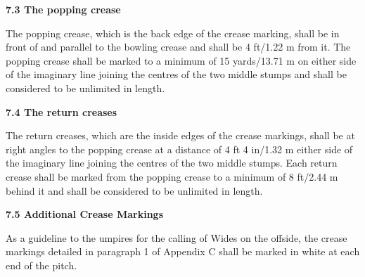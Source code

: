 \documentclass[12pt]{article}
\begin{document}
\vspace{\baselineskip}
{\fontsize{11pt}{13.2pt}\selectfont \textbf{7.3 \tabto{0.47in} The popping crease}\par}\par


\vspace{\baselineskip}
\begin{adjustwidth}{0.0in}{0.11in}
{\fontsize{9pt}{10.8pt}\selectfont The popping crease, which is the back edge of the crease marking, shall be in front of and parallel to the bowling crease and shall be 4 ft/1.22 m from it. The popping crease shall be marked to a minimum of 15 yards/13.71 m on either side of the imaginary line joining the centres of the two middle stumps and shall be considered to be unlimited in length.\par}\par

\end{adjustwidth}


\vspace{\baselineskip}
{\fontsize{11pt}{13.2pt}\selectfont \textbf{7.4 \tabto{0.47in} The return creases}\par}\par


\vspace{\baselineskip}
\begin{adjustwidth}{0.0in}{0.06in}
{\fontsize{9pt}{10.8pt}\selectfont The return creases, which are the inside edges of the crease markings, shall be at right angles to the popping crease at a distance of 4 ft 4 in/1.32 m either side of the imaginary line joining the centres of the two middle stumps. Each return crease shall be marked from the popping crease to a minimum of 8 ft/2.44 m behind it and shall be considered to be unlimited in length.\par}\par

\end{adjustwidth}


\vspace{\baselineskip}
{\fontsize{11pt}{13.2pt}\selectfont \textbf{7.5 \tabto{0.47in} Additional Crease Markings}\par}\par


\vspace{\baselineskip}
\begin{adjustwidth}{0.0in}{0.15in}
{\fontsize{9pt}{10.8pt}\selectfont As a guideline to the umpires for the calling of Wides on the offside, the crease markings detailed in paragraph 1 of Appendix C shall be marked in white at each end of the pitch.\par}\par

\end{adjustwidth}
\end{document}
